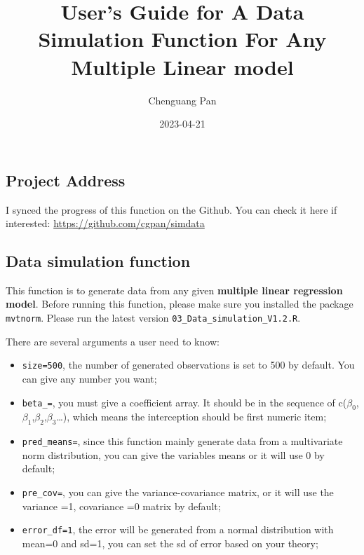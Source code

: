 \documentclass[
]{article}
\title{User's Guide for A Data Simulation Function For Any Multiple
Linear model}
\author{Chenguang Pan}
\date{2023-04-21}
\providecommand{\tightlist}{%
  \setlength{\itemsep}{0pt}\setlength{\parskip}{0pt}}
\begin{document}
\maketitle

\hypertarget{project-address}{%
\subsection{Project Address}\label{project-address}}

I synced the progress of this function on the Github. You can check it
here if interested: \url{https://github.com/cgpan/simdata}

\hypertarget{data-simulation-function}{%
\subsection{Data simulation function}\label{data-simulation-function}}

This function is to generate data from any given \textbf{multiple linear
regression model}. Before running this function, please make sure you
installed the package \texttt{mvtnorm}. Please run the latest version
\texttt{03\_Data\_simulation\_V1.2.R}.

There are several arguments a user need to know:

\begin{itemize}
\tightlist
\item
  \texttt{size=500}, the number of generated observations is set to 500
  by default. You can give any number you want;\\
\item
  \texttt{beta\_=}, you must give a coefficient array. It should be in
  the sequence of
  c(\(\beta_0\),\(\beta_1\),\(\beta_2\),\(\beta_3\)\ldots), which means
  the interception should be first numeric item;\\
\item
  \texttt{pred\_means=}, since this function mainly generate data from a
  multivariate norm distribution, you can give the variables means or it
  will use 0 by default;\\
\item
  \texttt{pre\_cov=}, you can give the variance-covariance matrix, or it
  will use the variance =1, covariance =0 matrix by default;
\item
  \texttt{error\_df=1}, the error will be generated from a normal
  distribution with mean=0 and sd=1, you can set the sd of error based
  on your theory;
\end{itemize}
\end{document}

